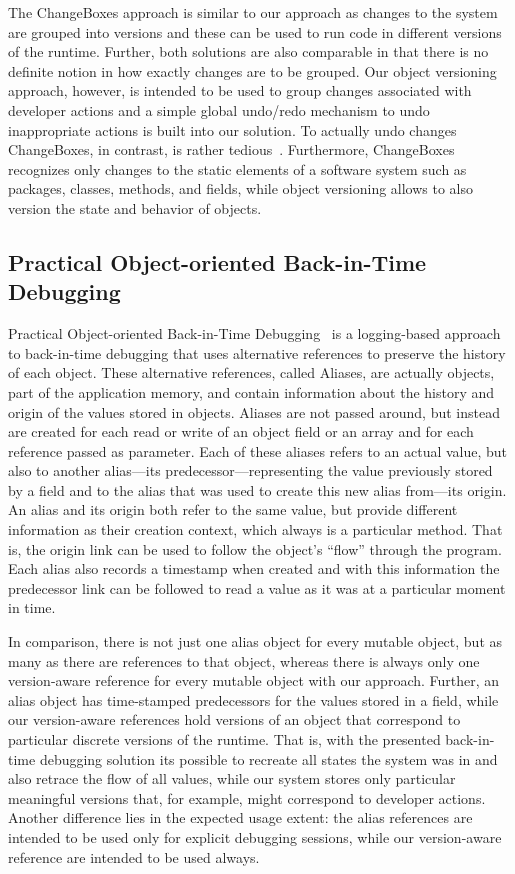 The ChangeBoxes approach is similar to our approach as changes to the system are grouped into versions and these can be used to run code in different versions of the runtime.
Further, both solutions are also comparable in that there is no definite notion in how exactly changes are to be grouped.
Our object versioning approach, however, is intended to be used to group changes associated with developer actions and a simple global undo/redo mechanism to undo inappropriate actions is built into our solution.
To actually undo changes ChangeBoxes, in contrast, is rather tedious~\cite{Steinert2012COE}.
Furthermore, ChangeBoxes recognizes only changes to the static elements of a software system such as packages, classes, methods, and fields, while object versioning allows to also version the state and behavior of objects.


\subsection{Practical Object-oriented Back-in-Time Debugging}

Practical Object-oriented Back-in-Time Debugging~\cite{Lienhard2008POB} is a logging-based approach to back-in-time debugging that uses alternative references to preserve the history of each object.
These alternative references, called Aliases, are actually objects, part of the application memory, and contain information about the history and origin of the values stored in objects.
Aliases are not passed around, but instead are created for each read or write of an object field or an array and for each reference passed as parameter.
Each of these aliases refers to an actual value, but also to another alias---its predecessor---representing the value previously stored by a field and to the alias that was used to create this new alias from---its origin.
An alias and its origin both refer to the same value, but provide different information as their creation context, which always is a particular method.
That is, the origin link can be used to follow the object's ``flow'' through the program.
Each alias also records a timestamp when created and with this information the predecessor link can be followed to read a value as it was at a particular moment in time.

In comparison, there is not just one alias object for every mutable object, but as many as there are references to that object, whereas there is always only one version-aware reference for every mutable object with our approach.
Further, an alias object has time-stamped predecessors for the values stored in a field, while our version-aware references hold versions of an object that correspond to particular discrete versions of the runtime.
That is, with the presented back-in-time debugging solution its possible to recreate all states the system was in and also retrace the flow of all values, while our system stores only particular meaningful versions that, for example, might correspond to developer actions.
Another difference lies in the expected usage extent: the alias references are intended to be used only for explicit debugging sessions, while our version-aware reference are intended to be used always.


